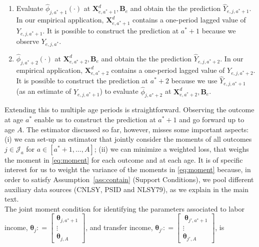 \begin{enumerate}
\item Evaluate $\hat{\phi}_{j,a^*+1} \left( \cdot \right)$ at  $\bm{X}_{e,a^*+1}^d, \bm{B}_{e}$ and obtain the the prediction $\hat{Y}_{e,j,a^*+1}$. In our empirical application, $\bm{X}_{e,a^*+1}^d$ contains a one-period lagged value of $Y_{e,j,a^*+1}$. It is possible to construct the prediction at $a^*+1$ because we observe $Y_{e,j,a^*}$.

\item $\hat{\phi}_{j,a^*+2} \left( \cdot \right)$ at  $\bm{X}_{e,a^*+2}^d, \bm{B}_{e}$ and obtain the the prediction $\hat{Y}_{e,j,a^*+2}$. In our empirical application, $\bm{X}_{e,a^*+2}^d$ contains a one-period lagged value of $Y_{e,j,a^*+2}$. It is possible to construct the prediction at $a^*+2$ because we use $\hat{Y}_{e,j,a^*+1}$ (as an estimate of $Y_{e,j,a^*+1}$) to evaluate $\hat{\phi}_{j,a^*+2}$ at  $\bm{X}_{e,a^*+2}^d, \bm{B}_{e}$.
\end{enumerate}

\noindent Extending this to multiple age periods is straightforward. Observing the outcome at age $a^*$ enable us to construct the prediction at $a^*+1$ and go forward up to age $A$. The estimator discussed so far, however, misses some important aspects: (i) we can set-up an estimator that jointly consider the moments of all outcomes $j \in \mathcal{J}_{a}$ for $a \in [a^*+1, \ldots, A]$; (ii) we can minimize a weighted loss, that weighs the moment in \eqref{eq:moment} for each outcome and at each age. It is of specific interest for us to weight the variance of the moments in \eqref{eq:moment} because, in order to satisfy Assumption~\ref{ass:contain} (Support Conditions), we pool different auxiliary data sources (CNLSY, PSID and NLSY79), as we explain in the main text.\\ 

\noindent The joint moment condition for identifying the parameters associated to labor income, $\bm{\theta}_{j} : =  \begin{bmatrix} \bm{\theta}_{j,a^*+1} \\ \vdots \\ \bm{\theta}_{j,A} \end{bmatrix}$, and transfer income, $\bm{\theta}_{j'}  : =  \begin{bmatrix} \ \bm{\theta}_{j',a^*+1} \\ \vdots \\ \bm{\theta}_{j',A}\end{bmatrix}$, is \\

